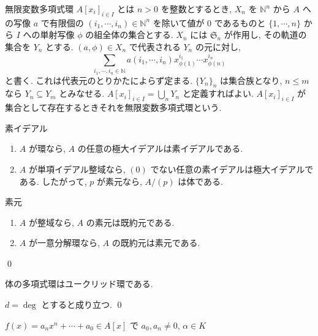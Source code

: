 \documentclass[uplatex,dvipdfmx,a4paper,11pt]{jlreq}
\makeatletter
\theoremstyle{definition}
\renewenvironment{proof}[1][\proofname]{\par
  \normalfont
  \topsep6\p@\@plus6\p@ \trivlist
  \item[\hskip\labelsep{\bfseries #1}\@addpunct{\bfseries}]\ignorespaces\quad\par
}{%
  \qed\endtrivlist\@endpefalse
}
\renewcommand\proofname{証明}
\makeatother
\begin{document}
\begin{definition}[無限変数多項式環]
  無限変数多項式環 $A[x_i]_{i\in I}$ とは $n > 0$ を整数とするとき, $X_n$ を $\mathbb{N}^n$ から $A$ への写像 $a$ で有限個の $(i_1,\cdots,i_n)\in\mathbb{N}^n$ を除いて値が $0$ であるものと $\lbrace1,\cdots,n\rbrace$ から $I$ への単射写像 $\phi$ の組全体の集合とする. $X_n$ には $\mathfrak{S}_n$ が作用し, その軌道の集合を $Y_n$ とする. $(a,\phi)\in X_n$ で代表される $Y_n$ の元に対し,
  $$\sum_{i_1,\cdots,i_n\in\mathbb{N}}a(i_1,\cdots,i_n)x_{\phi(1)}^{i_1}\cdots x_{\phi(n)}^{i_n}$$
  と書く. これは代表元のとりかたによらず定まる. $\lbrace Y_n\rbrace_n$ は集合族となり, $n\leq m$ なら $Y_n \subseteq Y_m$ とみなせる. $A[x_i]_{i\in I} = \bigcup_n Y_n$ と定義すればよい. $A[x_i]_{i\in I}$ が集合として存在するときそれを無限変数多項式環という.
\end{definition}






\begin{proposition}[素イデアルと極大イデアルの関係]
  素イデアル
  \begin{enumerate}
    \item $A$ が環なら, $A$ の任意の極大イデアルは素イデアルである.
    \item $A$ が単項イデアル整域なら, $(0)$ でない任意の素イデアルは極大イデアルである. したがって, $p$ が素元なら, $A/(p)$ は体である.
  \end{enumerate}
\end{proposition}
\begin{proposition}[素元と既約元の関係]
  素元
  \begin{enumerate}
    \item $A$ が整域なら, $A$ の素元は既約元である.
    \item $A$ が一意分解環なら, $A$ の既約元は素元である.
  \end{enumerate}
\end{proposition}
\begin{proof}

\end{proof}

\begin{proposition}
  体の多項式環はユークリッド環である.
\end{proposition}
\begin{proof}
  $d = \deg$ とすると成り立つ.
\end{proof}

\begin{proposition}[正規環]
  $f(x) = a_nx^n + \cdots + a_0\in A[x]$ で $a_0, a_n \neq 0$, $\alpha\in K$
\end{proposition}
\end{document}
